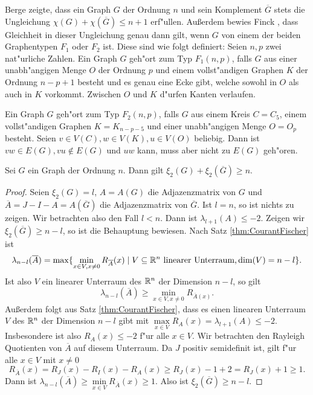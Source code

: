 Berge \cite[Kapitel 15, Satz 2]{Berge91} zeigte, dass ein Graph $G$ der Ordnung $n$ und sein Komplement $\overline{G}$ stets die Ungleichung $\chi(G) + \chi(\overline{G}) \leq n+1$ erf"ullen. Au{\ss}erdem bewies Finck \cite{Finck66}, dass Gleichheit in dieser Ungleichung genau dann gilt, wenn $G$ von einem der beiden Graphentypen $F_1$ oder $F_2$ ist. 
Diese sind wie folgt definiert:
Seien $n,p$ zwei nat"urliche Zahlen. Ein Graph $G$ geh"ort zum Typ $F_1 (n,p)$, falls $G$ aus einer unabh"angigen Menge $O$ der Ordnung $p$ und einem vollst"andigen Graphen $K$ der Ordnung $n-p+1$ besteht und es genau eine Ecke gibt, welche sowohl in $O$ als auch in $K$ vorkommt. Zwischen $O$ und $K$ d"urfen Kanten verlaufen. 

Ein Graph $G$ geh"ort zum Typ $F_2(n,p)$, falls $G$ aus einem Kreis $C=C_5$, einem vollst"andigen Graphen $K=K_{n-p-5}$ und einer unabh"angigen Menge $O=O_{p}$ besteht. 
Seien $v\in V(C), w\in V(K), u\in V(O)$ beliebig. Dann ist $vw\in E(G), vu\notin E(G) $ und $uw$ kann, muss aber nicht zu $E(G)$ geh"oren.

\begin{theorem}
  Sei $G$ ein Graph der Ordnung $n$. Dann gilt 
  $\xi_{2}(G) + \xi_{2}(\overline{G}) \geq n.$ 
  \label{thm:xikomplement}
\end{theorem}
\begin{proof}
  Seien $\xi_{2}(G) = l$, $A= A(G)$ die Adjazenzmatrix von $G$ und $\overline A = J-I-A = A(\overline{G})$ die Adjazenzmatrix von $\overline{G}$. 
  Ist $l = n$, so ist nichts zu zeigen. Wir betrachten also den Fall $l< n$. Dann ist $\lambda_{l+1}(A) \leq -2$. Zeigen wir $\xi_{2}(\overline{G}) \geq n-l$, so ist die Behauptung bewiesen. 
  Nach Satz \ref{thm:CourantFischer} ist 
  $$\lambda_{n-l}(\overline{A}) = \max\{\min\limits_{x\in V , x \neq 0} R_{\overline{A}}(x) \;|\;  V\subseteq {\mathbb{R}}^n \text{ linearer Unterraum,} \operatorname{dim}(V) =  n-l \}.$$
  Ist also $V$ ein linearer Unterraum des ${\mathbb{R}}^{n}$ der Dimension $n-l$, so gilt $$\lambda_{n-l} (\overline{A}) \geq \min\limits_{x\in V, x\neq 0} R_{\overline{A}(x)}.$$
  Au{\ss}erdem folgt aus Satz \ref{thm:CourantFischer}, dass es einen linearen Unterraum $V$ des ${\mathbb{R}}^{n}$ der Dimension $n-l$ gibt mit $ \max \limits_{x\in V}R_{A}(x) =\lambda_{l+1} (A)  \leq -2$.
  Insbesondere ist also $R_{A}(x) \leq -2$ f"ur alle $x\in V$.
  Wir betrachten den Rayleigh Quotienten von $\overline{A}$ auf diesem Unterraum. Da $J$ positiv semidefinit ist, gilt f"ur alle $x\in V$ mit $x\neq 0$
  $$R_{\overline{A}}(x) = R_{J}(x) - R_I(x) - R_A(x) \geq  R_J(x) - 1 + 2 = R_J(x) +1  \geq 1.$$
  Dann ist $\lambda_{n-l}(\overline{A}) \geq \min\limits_{x\in V} R_{\overline{A}}(x) \geq 1$. 
  Also ist $\xi_{2}(\overline{G}) \geq n-l$. 
\end{proof}



